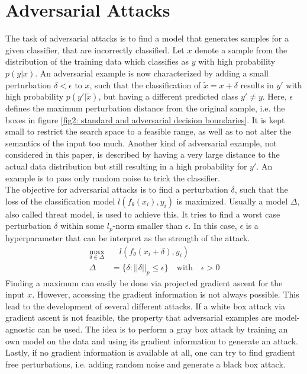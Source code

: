 \documentclass{article}
\begin{document}
\section{Adversarial Attacks}
  
The task of adversarial attacks is to find a model that generates samples for a given classifier, that are incorrectly classified. Let $x$ denote a sample from the distribution of the training data which classifies as $y$ with high probability $p(y|x)$. An adversarial example is now characterized by adding a small perturbation $\delta < \epsilon$ to $x$, such that the classification of $\tilde{x} = x + \delta$ results in $y'$ with high probability $p(y'|\tilde{x})$, but having a different predicted class $y' \neq y$. Here, $\epsilon$ defines the maximum perturbation distance from the original sample, i.e. the boxes in figure \ref{fig2: standard and adversarial decision boundaries}. It is kept small to restrict the search space to a feasible range, as well as to not alter the semantics of the input too much. Another kind of adversarial example, not considered in this paper, is described by having a very large distance to the actual data distribution but still resulting in a high probability for $y'$. An example is to pass only random noise to trick the classifier. \\
The objective for adversarial attacks is to find a perturbation $\delta$, such that the loss of the classification model $l(f_{\theta}(x_i), y_i)$ is maximized. Usually a model $\Delta$, also called threat model, is used to achieve this. It tries to find a worst case perturbation $\delta$ within some $l_p$-norm smaller than $\epsilon$. In this case, $\epsilon$ is a hyperparameter that can be interpret as the strength of the attack. 
\vspace{-0.2cm}
\begin{align*}
  \max_{\delta \in \Delta} & \quad l(f_{\theta}(x_i + \delta), y_i)  \\
  \Delta &= \{\delta : ||\delta||_p \leq \epsilon\} \quad \text{with} \quad \epsilon > 0
\end{align*}
Finding a maximum can easily be done via projected gradient ascent for the input $x$. However, accessing the gradient information is not always possible. This lead to the development of several different attacks. If a white box attack via gradient ascent is not feasible, the property that adversarial examples are model-agnostic can be used. The idea is to perform a gray box attack by training an own model on the data and using its gradient information to generate an attack. Lastly, if no gradient information is available at all, one can try to find gradient free perturbations, i.e. adding random noise and generate a black box attack. \\
\end{document}
